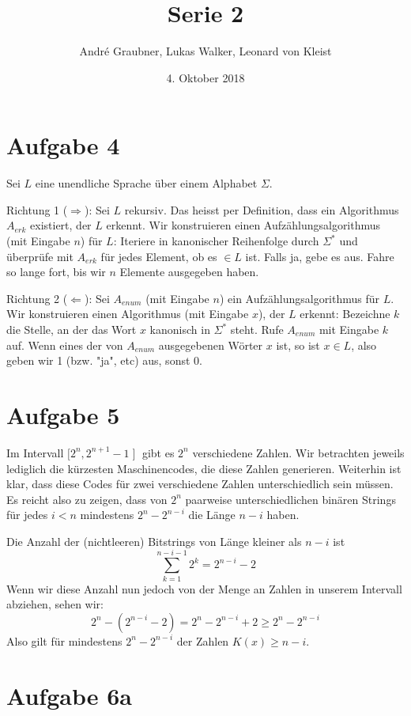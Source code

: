\documentclass[a4paper]{article}
\title{Serie 2}
\author{André Graubner, Lukas Walker, Leonard von Kleist}
\date{4. Oktober 2018}
\begin{document}
 

\maketitle

\section{Aufgabe 4}
	
	Sei $L$ eine unendliche Sprache über einem Alphabet $\Sigma$.
	
	Richtung 1 ($\Rightarrow$):
	Sei $L$ rekursiv.
	Das heisst per Definition, dass ein Algorithmus $A_{erk}$ existiert, der $L$ erkennt.
	Wir konstruieren einen Aufzählungsalgorithmus (mit Eingabe $n$) für $L$:
	Iteriere in kanonischer Reihenfolge durch $\Sigma^*$ und überprüfe mit $A_{erk}$ für 
	jedes Element, ob es $\in L$ ist. Falls ja, gebe es aus. Fahre so lange fort, bis wir
	$n$ Elemente ausgegeben haben.

	Richtung 2 ($\Leftarrow$):
	Sei $A_{enum}$ (mit Eingabe $n$) ein Aufzählungsalgorithmus für $L$.
	Wir konstruieren einen Algorithmus (mit Eingabe $x$), der $L$ erkennt:
	Bezeichne $k$ die Stelle, an der das Wort $x$ kanonisch in $\Sigma^*$ steht.
	Rufe $A_{enum}$ mit Eingabe $k$ auf. Wenn eines der von $A_{enum}$ ausgegebenen
	Wörter $x$ ist, so ist $x \in L$, also geben wir 1 (bzw. "ja", etc) aus, sonst 0.

\section{Aufgabe 5}

	Im Intervall $\mathopen[2^n, 2^{n+1}-1 \mathopen]$ gibt es $2^n$ verschiedene Zahlen.
	Wir betrachten jeweils lediglich die kürzesten Maschinencodes, die diese Zahlen generieren.
	Weiterhin ist klar, dass diese Codes für zwei verschiedene Zahlen unterschiedlich sein müssen. 
	Es reicht also zu zeigen, dass von $2^n$ paarweise unterschiedlichen binären Strings
	für jedes $i < n$ mindestens $2^n - 2^{n-i}$ die Länge $n - i$ haben.

	Die Anzahl der (nichtleeren) Bitstrings von Länge kleiner als $n - i$ ist 
	\[\sum_{k=1}^{n-i-1} 2^k = 2^{n-i} - 2\]
	Wenn wir diese Anzahl nun jedoch von der Menge an Zahlen in unserem Intervall abziehen, sehen wir:
	\[2^n - (2^{n-i} - 2) = 2^n - 2^{n-i} + 2 \geq 2^n - 2^{n-i}\]
	Also gilt für mindestens $2^n - 2^{n-i}$ der Zahlen $K(x) \geq n-i$.

\section{Aufgabe 6a}
\end{document}
